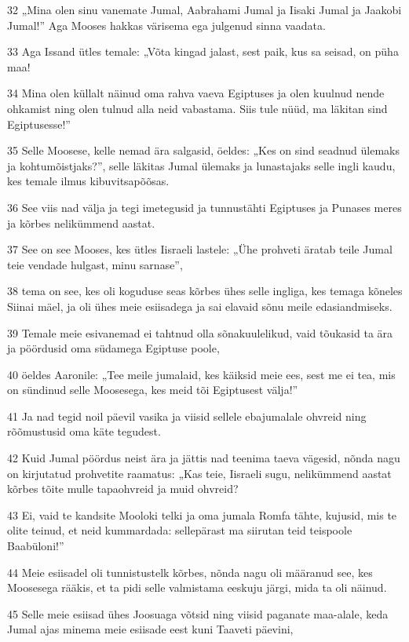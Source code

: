 \par 32 „Mina olen sinu vanemate Jumal, Aabrahami Jumal ja Iisaki Jumal ja Jaakobi Jumal!” Aga Mooses hakkas värisema ega julgenud sinna vaadata.
\par 33 Aga Issand ütles temale: „Võta kingad jalast, sest paik, kus sa seisad, on püha maa!
\par 34 Mina olen küllalt näinud oma rahva vaeva Egiptuses ja olen kuulnud nende ohkamist ning olen tulnud alla neid vabastama. Siis tule nüüd, ma läkitan sind Egiptusesse!”
\par 35 Selle Moosese, kelle nemad ära salgasid, öeldes: „Kes on sind seadnud ülemaks ja kohtumõistjaks?”, selle läkitas Jumal ülemaks ja lunastajaks selle ingli kaudu, kes temale ilmus kibuvitsapõõsas.
\par 36 See viis nad välja ja tegi imetegusid ja tunnustähti Egiptuses ja Punases meres ja kõrbes nelikümmend aastat.
\par 37 See on see Mooses, kes ütles Iisraeli lastele: „Ühe prohveti äratab teile Jumal teie vendade hulgast, minu sarnase”,
\par 38 tema on see, kes oli koguduse seas kõrbes ühes selle ingliga, kes temaga kõneles Siinai mäel, ja oli ühes meie esiisadega ja sai elavaid sõnu meile edasiandmiseks.
\par 39 Temale meie esivanemad ei tahtnud olla sõnakuulelikud, vaid tõukasid ta ära ja pöördusid oma südamega Egiptuse poole,
\par 40 öeldes Aaronile: „Tee meile jumalaid, kes käiksid meie ees, sest me ei tea, mis on sündinud selle Moosesega, kes meid tõi Egiptusest välja!”
\par 41 Ja nad tegid noil päevil vasika ja viisid sellele ebajumalale ohvreid ning rõõmustusid oma käte tegudest.
\par 42 Kuid Jumal pöördus neist ära ja jättis nad teenima taeva vägesid, nõnda nagu on kirjutatud prohvetite raamatus: „Kas teie, Iisraeli sugu, nelikümmend aastat kõrbes tõite mulle tapaohvreid ja muid ohvreid?
\par 43 Ei, vaid te kandsite Mooloki telki ja oma jumala Romfa tähte, kujusid, mis te olite teinud, et neid kummardada: sellepärast ma siirutan teid teispoole Baabüloni!”
\par 44 Meie esiisadel oli tunnistustelk kõrbes, nõnda nagu oli määranud see, kes Moosesega rääkis, et ta pidi selle valmistama eeskuju järgi, mida ta oli näinud.
\par 45 Selle meie esiisad ühes Joosuaga võtsid ning viisid paganate maa-alale, keda Jumal ajas minema meie esiisade eest kuni Taaveti päevini,

